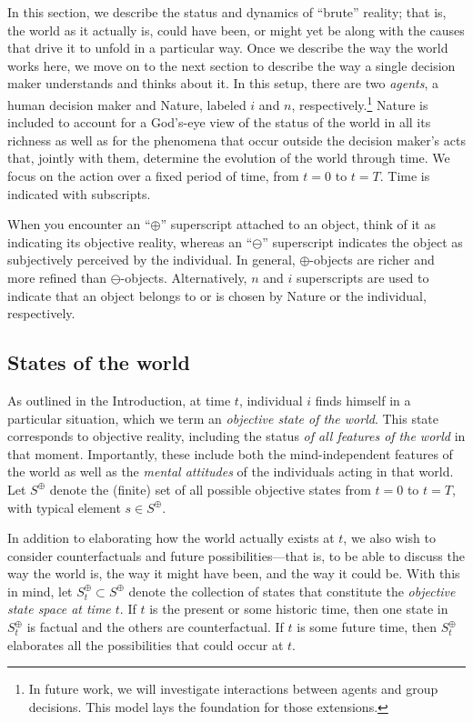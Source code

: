 \documentclass[
11pt,
titlepage,
reqno,
]{article}%
\theoremstyle{definition}
\begin{document}
In this section, we describe the status and dynamics of ``brute'' reality; that is, the world as it actually is, could have been, or might yet be along with the causes that drive it to unfold in a particular way. 
Once we describe the way the world works here, we move on to the next section to describe the way a single decision maker understands and thinks about it.
In this setup, there are two \textit{agents}, a human decision maker and Nature, labeled $i$ and $n$, respectively.\footnote
{
	In future work, we will investigate interactions between agents and group decisions.
	This model lays the foundation for those extensions.
} 
Nature is included to account for  a God's-eye view of the status of the world in all its richness as well as for the phenomena that occur outside the decision maker's acts that, jointly with them, determine the evolution of the world through time.
We focus on the action over a fixed period of time, from $t=0$ to $t=T$. 
Time is indicated with subscripts.

When you encounter an ``$\oplus$'' superscript attached to an object, think of it as indicating its objective reality, whereas an ``$\ominus$'' superscript indicates the object as subjectively perceived by the individual.
In general, $\oplus$-objects are richer and more refined than $\ominus$-objects. 
Alternatively, $n$ and $i$ superscripts are used to indicate that an object belongs to or is chosen by Nature or the individual, respectively.

 


\subsection{States of the world\label{sec:states}}

As outlined in the Introduction, at time $t$, individual $i$ finds himself in a particular situation, which we term an \textit{objective state of the world}.
This state corresponds to objective reality, including the status \textit{of all features of the world} in that moment. 
Importantly, these include both the  mind-independent features of the world as well as the \textit{mental attitudes} of the individuals acting in that world. 
Let $S^\oplus$ denote the (finite) set of all possible objective states from $t=0$ to $t=T$, with typical element $s\in S^\oplus$.

In addition to elaborating how the world actually exists at $t$, we also wish to consider counterfactuals and future possibilities---that is, to be able to discuss the way the world is, the way it might have been, and the way it could be.
With this in mind, let $S^\oplus_t\subset S^\oplus$ denote the collection of states that constitute the \textit{objective state space at time $t$}. 
If $t$ is the present or some historic time, then one state in  $S^\oplus_t$ is factual and the others are counterfactual. 
If $t$ is some future time, then $S^\oplus_t$ elaborates all the possibilities that could occur at $t$.
\end{document}
